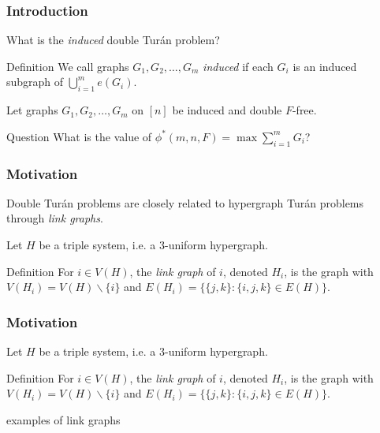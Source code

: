 \documentclass{beamer}
\begin{document}
\begin{frame}
  \frametitle{Introduction}

  What is the \textit{induced} double Turán problem? \pause

  \begin{block}{Definition}
    We call graphs $G_1, G_2, \ldots, G_m$ \textit{induced} if each $G_i$ is an induced subgraph of $\bigcup_{i = 1}^m e(G_i)$.
  \end{block}

  \pause

  \vspace{0.5cm}

  Let graphs $G_1, G_2, \ldots, G_m$ on $[n]$ be induced and double $F$-free.

  \begin{block}{Question}
    What is the value of $\phi^*(m, n, F) = \max \sum_{i = 1}^m G_i$?
  \end{block}
\end{frame}

\begin{frame}
  \frametitle{Motivation}

  Double Turán problems are closely related to hypergraph Turán problems through \textit{link graphs}.

  \pause

  \vspace{0.5cm}

  Let $H$ be a triple system, i.e. a 3-uniform hypergraph. 
  
  \begin{block}{Definition}
    For $i \in V(H)$, the \textit{link graph} of $i$, denoted $H_i$, is the graph with $V(H_i) = V(H) \backslash \{i\}$ and $E(H_i) = \{\{j, k\} : \{i, j, k\} \in E(H)\}$. 
  \end{block}
\end{frame}

\begin{frame}

  \frametitle{Motivation}

  Let $H$ be a triple system, i.e. a 3-uniform hypergraph. 
  
  \begin{block}{Definition}
    For $i \in V(H)$, the \textit{link graph} of $i$, denoted $H_i$, is the graph with $V(H_i) = V(H) \backslash \{i\}$ and $E(H_i) = \{\{j, k\} : \{i, j, k\} \in E(H)\}$. 
  \end{block}

  \vspace{0.5cm}

  examples of link graphs
\end{frame}
\end{document}
